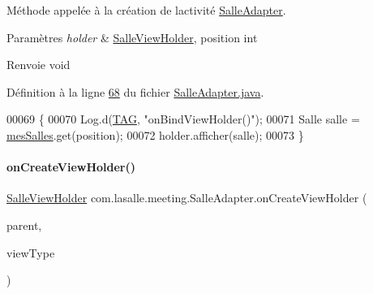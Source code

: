 Méthode appelée à la création de l\textquotesingle{}activité \hyperlink{classcom_1_1lasalle_1_1meeting_1_1_salle_adapter}{Salle\+Adapter}. 


\begin{DoxyParams}{Paramètres}
{\em holder} & \hyperlink{classcom_1_1lasalle_1_1meeting_1_1_salle_view_holder}{Salle\+View\+Holder}, position int \\
\hline
\end{DoxyParams}
\begin{DoxyReturn}{Renvoie}
void 
\end{DoxyReturn}


Définition à la ligne \hyperlink{_salle_adapter_8java_source_l00068}{68} du fichier \hyperlink{_salle_adapter_8java_source}{Salle\+Adapter.\+java}.


\begin{DoxyCode}
00069     \{
00070         Log.d(\hyperlink{classcom_1_1lasalle_1_1meeting_1_1_salle_adapter_a774947591a1beedaffd58989783206b1}{TAG}, \textcolor{stringliteral}{"onBindViewHolder()"});
00071         Salle salle = \hyperlink{classcom_1_1lasalle_1_1meeting_1_1_salle_adapter_a3988ff211fbf3052b553d77ba0711a5a}{mesSalles}.get(position);
00072         holder.afficher(salle);
00073     \}
\end{DoxyCode}
\mbox{\label{classcom_1_1lasalle_1_1meeting_1_1_salle_adapter_a35aef67b6f83b63fdc9898f6024b24ac}} 
\paragraph{\texorpdfstring{on\+Create\+View\+Holder()}{onCreateViewHolder()}}
{\footnotesize\ttfamily \hyperlink{classcom_1_1lasalle_1_1meeting_1_1_salle_view_holder}{Salle\+View\+Holder} com.\+lasalle.\+meeting.\+Salle\+Adapter.\+on\+Create\+View\+Holder (\begin{DoxyParamCaption}\item[{@Non\+Null View\+Group}]{parent,  }\item[{int}]{view\+Type }\end{DoxyParamCaption})}



